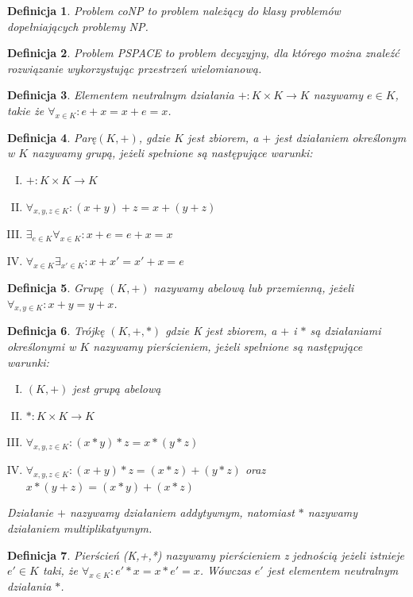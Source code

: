 \documentclass[12pt,a4paper]{article}
\newtheorem{df}{Definicja}[section]
\begin{document}
\begin {df} 
Problem coNP to problem nale\.z\k{a}cy do klasy problem\'ow dope{\l}niaj\k{a}cych problemy NP.
\end{df}
\begin{df}
Problem PSPACE to problem decyzyjny, dla kt\'orego mo\.zna znale\'z\'c rozwi\k{a}zanie wykorzystuj\k{a}c przestrze\'n wielomianow\k{a}.
\end{df}
\begin{df} 
Elementem neutralnym dzia{\l}ania $+:K\times K\rightarrow K$ nazywamy $e\in K$, takie \.ze $\forall_{x\in K}:e+x=x+e=x$.
\end{df}
\begin{df} 
Par\k{e}$(K,+)$, gdzie $K$ jest zbiorem, a $+$ jest dzia{\l}aniem okre\'slonym w $K$ nazywamy grup\k{a}, je\.zeli spe{\l}nione s\k{a} nast\k{e}puj\k{a}ce warunki:
\begin{enumerate}[I.]
\item $+: K\times K \rightarrow K$
\item $\forall_{x,y,z\in K}: (x+y)+z=x+(y+z)$
\item $\exists_{e\in K} \forall_{x\in K}: x+e=e+x=x$ 
\item $\forall_{x\in K} \exists_{x'\in K}: x+x'=x'+x=e$
\end{enumerate}
\end{df}
\begin{df} 
Grup\k{e} $(K,+)$ nazywamy abelow\k{a} lub przemienn\k{a}, je\.zeli $\forall_{x,y\in K}: x+y=y+x$.
\end{df}
\begin{df} 
Tr\'ojk\k{e} $(K,+,*)$ gdzie K jest zbiorem, a $+$ i $*$ s\k{a} dzia{\l}aniami okre\'slonymi w $K$ nazywamy pier\'scieniem, je\.zeli spe{\l}nione s\k{a} nast\k{e}puj\k{a}ce warunki:
\begin{enumerate}[I.]
\item $(K,+)$ jest grup\k{a} abelow\k{a} 
\item $*:K\times K \rightarrow K$ 
\item $\forall_{x,y,z\in K}: (x*y)*z=x*(y*z)$
\item $\forall_{x,y,z\in K}: (x+y)*z=(x*z)+(y*z)$ oraz $x*(y+z)=(x*y)+(x*z)$
\end{enumerate}
Dzia{\l}anie $+$ nazywamy dzia{\l}aniem addytywnym, natomiast $*$ nazywamy dzia{\l}aniem multiplikatywnym.
\end{df}
\begin{df} 
Pier\'scie\'n (K,+,*) nazywamy pier\'scieniem z jedno\'sci\k{a} je\.zeli istnieje $e'\in K$ taki, \.ze $\forall_{x\in K}: e'*x=x*e'=x$. W\'owczas $e'$ jest elementem neutralnym dzia{\l}ania $*$.
\end{df}
\end{document}
